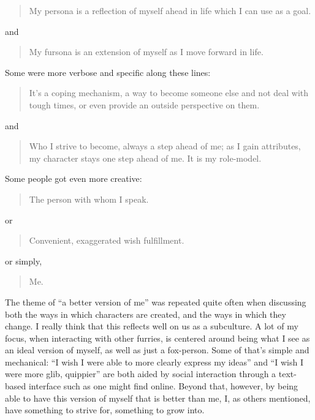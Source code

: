 \begin{quote}
My persona is a reflection of myself ahead in life which I can use as a
goal.
\end{quote}

and

\begin{quote}
My fursona is an extension of myself as I move forward in life.
\end{quote}

Some were more verbose and specific along these lines:

\begin{quote}
It's a coping mechanism, a way to become someone else and not deal with
tough times, or even provide an outside perspective on them.
\end{quote}

and

\begin{quote}
Who I strive to become, always a step ahead of me; as I gain attributes,
my character stays one step ahead of me. It is my role-model.
\end{quote}

Some people got even more creative:

\begin{quote}
The person with whom I speak.
\end{quote}

or

\begin{quote}
Convenient, exaggerated wish fulfillment.
\end{quote}

or simply,

\begin{quote}
Me.
\end{quote}

The theme of ``a better version of me'' was repeated quite often when
discussing both the ways in which characters are created, and the ways
in which they change. I really think that this reflects well on us as a
subculture. A lot of my focus, when interacting with other furries, is
centered around being what I see as an ideal version of myself, as well
as just a fox-person. Some of that's simple and mechanical: ``I wish I
were able to more clearly express my ideas'' and ``I wish I were more
glib, quippier'' are both aided by social interaction through a
text-based interface such as one might find online. Beyond that,
however, by being able to have this version of myself that is better
than me, I, as others mentioned, have something to strive for, something
to grow into.

